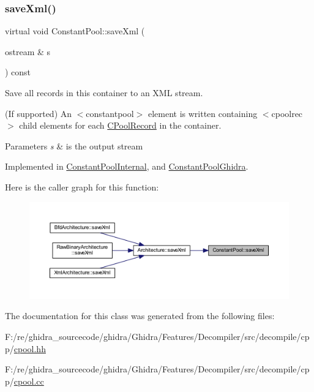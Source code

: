 \subsubsection{\texorpdfstring{saveXml()}{saveXml()}}
{\footnotesize\ttfamily virtual void Constant\+Pool\+::save\+Xml (\begin{DoxyParamCaption}\item[{ostream \&}]{s }\end{DoxyParamCaption}) const\hspace{0.3cm}{\ttfamily [pure virtual]}}



Save all records in this container to an X\+ML stream. 

(If supported) An $<$constantpool$>$ element is written containing $<$cpoolrec$>$ child elements for each \mbox{\hyperlink{class_c_pool_record}{C\+Pool\+Record}} in the container. 
\begin{DoxyParams}{Parameters}
{\em s} & is the output stream \\
\hline
\end{DoxyParams}


Implemented in \mbox{\hyperlink{class_constant_pool_internal_a5386f07fda2fff612dca7acea0ea68ad}{Constant\+Pool\+Internal}}, and \mbox{\hyperlink{class_constant_pool_ghidra_a9be92093e47d8158d6df6ca7c6524f80}{Constant\+Pool\+Ghidra}}.

Here is the caller graph for this function\+:
\nopagebreak
\begin{figure}[H]
\begin{center}
\leavevmode
\includegraphics[width=350pt]{class_constant_pool_a859daeda0a7969af5462f6484905ab08_icgraph}
\end{center}
\end{figure}


The documentation for this class was generated from the following files\+:\begin{DoxyCompactItemize}
\item 
F\+:/re/ghidra\+\_\+sourcecode/ghidra/\+Ghidra/\+Features/\+Decompiler/src/decompile/cpp/\mbox{\hyperlink{cpool_8hh}{cpool.\+hh}}\item 
F\+:/re/ghidra\+\_\+sourcecode/ghidra/\+Ghidra/\+Features/\+Decompiler/src/decompile/cpp/\mbox{\hyperlink{cpool_8cc}{cpool.\+cc}}\end{DoxyCompactItemize}
